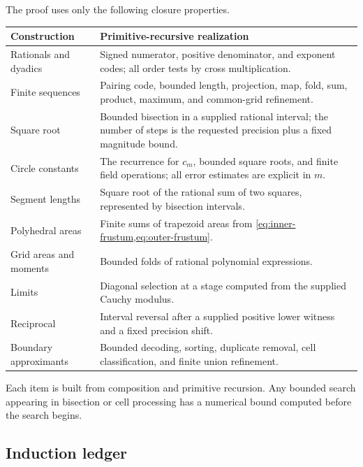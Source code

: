 \documentclass[11pt]{article}
\theoremstyle{definition}
\begin{document}
The proof uses only the following closure properties.
\begin{longtable}{@{}p{}p{}@{}}
\toprule
Construction & Primitive-recursive realization \\
\midrule
Rationals and dyadics & Signed numerator, positive denominator, and exponent
codes; all order tests by cross multiplication.\\
Finite sequences & Pairing code, bounded length, projection, map, fold, sum,
product, maximum, and common-grid refinement.\\
Square root & Bounded bisection in a supplied rational interval; the number of
steps is the requested precision plus a fixed magnitude bound.\\
Circle constants & The recurrence for $c_m$, bounded square roots, and finite
field operations; all error estimates are explicit in $m$.\\
Segment lengths & Square root of the rational sum of two squares, represented
by bisection intervals.\\
Polyhedral areas & Finite sums of trapezoid areas from
\cref{eq:inner-frustum,eq:outer-frustum}.\\
Grid areas and moments & Bounded folds of rational polynomial expressions.\\
Limits & Diagonal selection at a stage computed from the supplied Cauchy
modulus.\\
Reciprocal & Interval reversal after a supplied positive lower witness and a
fixed precision shift.\\
Boundary approximants & Bounded decoding, sorting, duplicate removal, cell
classification, and finite union refinement.\\
\bottomrule
\end{longtable}

Each item is built from composition and primitive recursion.  Any bounded
search appearing in bisection or cell processing has a numerical bound
computed before the search begins.

\subsection{Induction ledger}
\end{document}
